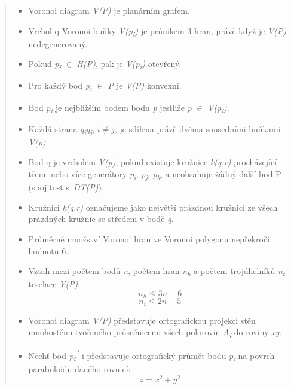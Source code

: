 \begin{quote}
\begin{itemize}

\item Voronoi diagram \textit{V(P)} je planárním grafem.
\item Vrchol q Voronoi buňky \textit{V(p\textsubscript{i})} je průnikem 3 hran, právě když je \textit{V(P)} nedegenerovaný.
\item Pokud \textit{p\textsubscript{i}} \(\in\) \textit{H(P)}, pak je \textit{V(p\textsubscript{i})}  otevřený. 
\item Pro každý bod \textit{p\textsubscript{i} \(\in\) P} je \textit{V(P)} konvexní. 
\item Bod \textit{p\textsubscript{i}} je nejbližším bodem bodu \textit{p}
jestliže \textit{p} \(\in\) \textit{V(p\textsubscript{i})}.
\item Každá strana \textit{q\textsubscript{i}q\textsubscript{j}}, \(i \neq j\),
je sdílena právě dvěma sousedními buňkami \textit{V(p)}. 
\item Bod q je vrcholem \textit{V(p)}, pokud existuje kružnice \textit{k(q,r)} procházející třemi
nebo více generátory \textit{p\textsubscript{i}}, \textit{p\textsubscript{j}},
\textit{p\textsubscript{k}}, a neobsahuje žádný další bod P (spojitost s~\textit{DT(P)}). 
\item Kružnici \textit{k(q,r)} označujeme jako největší prázdnou kružnici ze všech prázdných kružnic se středem v bodě \textit{q}. 
\item Průměrné množství Voronoi hran ve Voronoi polygonu nepřekročí hodnotu 6. 
\item Vztah mezi počtem bodů \textit{n}, počtem hran \textit{n\textsubscript{h}}
a počtem trojúhelníků \textit{n\textsubscript{t}} teselace \textit{V(P)}:
\[ n_h \leq 3n-6\]
\[ n_t \leq 2n−5\]
\item Voronoi diagram \textit{V(P)} představuje ortografickou projekci stěn
mnohostěnu tvořeného průsečnicemi všech polorovin \textit{A\textsubscript{i}} do roviny \textit{xy}. 
\item Nechť bod \textit{p\textsubscript{i}\textsuperscript{*}} i představuje
ortografický průmět bodu \textit{p\textsubscript{i}} na povrch parabo\-loidu daného rovnicí:
\[ z = x^2 + y^2 \]
   
\end{itemize}
\end{quote}

